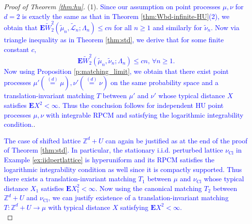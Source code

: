 \documentclass[12pt]{article}
\newcommand{\C}{ {\mathsf C}}
\newcommand{\Z}{\mathbb{Z}}
\newcommand{\tLeb}{\tilde{\mathcal{L}}}
\newcommand{\equlaw}{\stackrel{(d)}{=}}
\newcommand{\1}{\mathbf{1}}
\newcommand{\tmu}{\tilde{\mu}}
\newcommand{\nupl}{\nu_{\textrm{Cl}}}
\newcommand{\E}{\mathbf  E}
\newcommand{\RL}[1]{\textcolor{blue}{#1}}
\newcommand{\dy}[1]{\textcolor{blue}{#1}}
\newcommand{\RL}[1]{#1}%
\newcommand{\dy}[1]{#1}%
\renewcommand{\footnote}[1]{}
\begin{document}
{{{{{\begin{proof}[Proof of Theorem \ref{thm:hu}]
%

\noindent (1). \dy{Since our assumption on point processes $\mu,\nu$ for $d = 2$ is exactly the same as that in Theorem \ref{thm:Wbd-infinite-HU}(2), we obtain that $\E \widetilde W_2^2(\tmu _{n}, \tLeb _{n};\Lambda_n) \leqslant cn$  for all $n \geqslant  1$ and similarly for $\tilde \nu_n$. Now via triangle inequality as in Theorem \ref{thm:std}, we derive that for some finite constant $c$,
%
$$ \E \widetilde W_2^2(\tmu _{n}, \tilde \nu_{n};\Lambda_n) \leqslant cn, \, \forall n \geq 1.$$
%
Now using Proposition \ref{p:matching_limit}, we obtain that there exist point processes $ \mu ' (\equlaw \mu), \nu ' ( \equlaw \nu)$ on \RL{the same probability space}  and a translation-invariant matching $T$ between $\mu'$ and $\nu'$  whose  typical distance $X$ satisfies $ \mathbf E X^2 < \infty $.  Thus the conclusion follows for independent HU point processes $\mu,\nu$ with integrable RPCM and satisfying the logarithmic integrability condition.}. 

\dy{The case of shifted lattice $\Z^d + U$ can again be justified as at the end of the  proof of Theorem \ref{thm:std}. In particular, the stationary i.i.d. perturbed lattice $\nupl$ in Example \ref{ex:iidpertlattice} is hyperuniform and its RPCM satisfies the logarithmic integrability condition as well since it is compactly supported. Thus there exists a translation-invariant  matching $T_1$ between $\mu$ and $\nupl$ whose typical distance $X_1$ satisfies $\E X_1^2 < \infty$. Now using the canonical matching $T_2$ between $\Z^d + U$ and $\nupl$, we can justify existence of a translation-invariant matching $T : \Z^d + U \to \mu$ with typical distance $X$ satisfying $\E X^2 < \infty$.} \\



\end{proof}}}}}}
\end{document}
